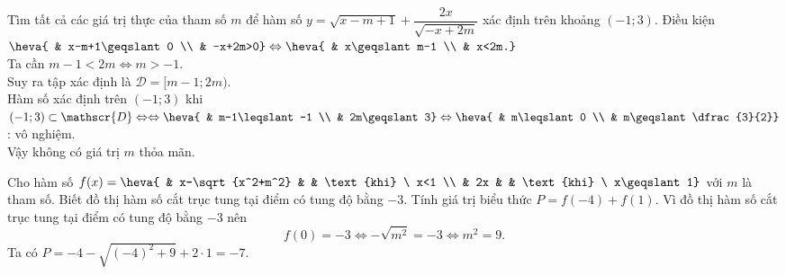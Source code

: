 \begin{vd}%
	Tìm tất cả các giá trị thực của tham số $m$ để hàm số $ y=\sqrt{x-m+1}+\dfrac{2x}{\sqrt{-x+2m}}$ xác định trên khoảng $(-1;3)$.
	\loigiai
	{
		Điều kiện $\heva{ & x-m+1\geqslant0 \\ & -x+2m>0} \Leftrightarrow \heva{ & x\geqslant m-1 \\ & x<2m.}$ \\
		Ta cần $m-1<2m \Leftrightarrow m>-1$. \\
		Suy ra tập xác định là $\mathscr{D}=[m-1;2m)$. \\
		Hàm số xác định trên $(-1;3)$ khi $(-1;3)\subset\mathscr{D} \Leftrightarrow \Leftrightarrow \heva{ & m-1\leqslant-1 \\ & 2m\geqslant3} \Leftrightarrow \heva{ & m\leqslant0 \\ & m\geqslant\dfrac{3}{2}}$: vô nghiệm. \\
		Vậy không có giá trị $m$ thỏa mãn.
	}
\end{vd}

\begin{vd}%
	Cho hàm số $f(x)=\heva{ & x-\sqrt{x^2+m^2} & & \text{khi} \ x<1 \\ & 2x & & \text{khi} \ x\geqslant1}$ với $m$ là tham số. Biết đồ thị hàm số cắt trục tung tại điểm có tung độ bằng $-3$. Tính giá trị biểu thức $P=f(-4)+f(1)$.
	\loigiai
	{
		Vì đồ thị hàm số cắt trục tung tại điểm có tung độ bằng $-3$ nên
		\[f(0)=-3 \Leftrightarrow -\sqrt{m^2}=-3 \Leftrightarrow m^2=9.\]
		Ta có $P=-4-\sqrt{\left(-4\right)^2+9}+2\cdot1=-7$.
	}
\end{vd}

\baitaptl

